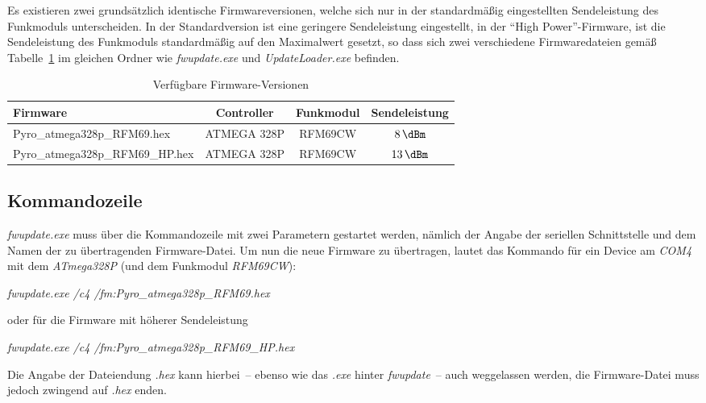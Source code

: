 \documentclass[paper=a4, parskip, numbers=noenddot, toc=listof, headsepline]{scrbook}
\begin{document}
		  Es existieren zwei grundsätzlich identische Firmwareversionen, welche sich nur in der standardmäßig eingestellten Sendeleistung des Funkmoduls unterscheiden. In der Standardversion ist eine geringere Sendeleistung eingestellt, in der \enquote{High Power}-Firmware, ist die Sendeleistung des Funkmoduls standardmäßig auf den Maximalwert gesetzt, so dass sich zwei verschiedene Firmwaredateien gemäß Tabelle~\ref{tab:firmwareversions} im gleichen Ordner wie \emph{fwupdate.exe} und \emph{UpdateLoader.exe} befinden.

		  \begin{table}
			  \centering
			  \begin{tabularx}{.925\textwidth}{Xccc}
				  \hline\hline
				  Firmware                        & Controller  & Funkmodul & Sendeleistung   \\ \hline
				  Pyro\_atmega328p\_RFM69.hex     & ATMEGA 328P & RFM69CW   & $\SI{8}{\dBm}$  \\
				  Pyro\_atmega328p\_RFM69\_HP.hex & ATMEGA 328P & RFM69CW   & $\SI{13}{\dBm}$ \\ \hline\hline
			  \end{tabularx}
			  \caption{Verfügbare Firmware-Versionen}
			  \label{tab:firmwareversions}
		  \end{table}

		  \subsection{Kommandozeile}

			  \emph{fwupdate.exe} muss über die Kommandozeile mit zwei Parametern gestartet werden, nämlich der Angabe der seriellen Schnittstelle und dem Namen der zu übertragenden Firmware-Datei. Um nun die neue Firmware zu übertragen, lautet das Kommando für ein Device am \emph{COM4} mit dem \emph{ATmega328P} (und dem Funkmodul \emph{RFM69CW}):

			  \begin{center}
				  \emph{fwupdate.exe /c4 /fm:Pyro\_atmega328p\_RFM69.hex}
			  \end{center}

			  oder für die Firmware mit höherer Sendeleistung

			  \begin{center}
				  \emph{fwupdate.exe /c4 /fm:Pyro\_atmega328p\_RFM69\_HP.hex}
			  \end{center}

			  Die Angabe der Dateiendung \emph{.hex} kann hierbei~-- ebenso wie das \emph{.exe} hinter \emph{fwupdate}~-- auch weggelassen werden, die Firmware-Datei muss jedoch zwingend auf \emph{.hex} enden.
\end{document}
